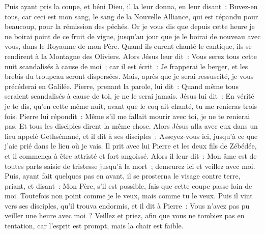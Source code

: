 \begin{multicols}{2}
Puis ayant pris la coupe, et béni Dieu, il la leur donna, en leur disant~: Buvez-en tous,
car ceci est mon sang, le sang de la Nouvelle Alliance, qui est répandu pour beaucoup, pour la rémission des péchés.
Or je vous dis que depuis cette heure je ne boirai point de ce fruit de vigne, jusqu'au jour que je le boirai de nouveau avec vous, dans le Royaume de mon Père.
Quand ils eurent chanté le cantique, ils se rendirent à la Montagne des Oliviers.
Alors Jésus leur dit~: Vous serez tous cette nuit scandalisés à cause de moi~; car il est écrit~: Je frapperai le berger, et les brebis du troupeau seront dispersées.
Mais, après que je serai ressuscité, je vous précéderai en Galilée.
Pierre, prenant la parole, lui dit~: Quand même tous seraient scandalisés à cause de toi, je ne le serai jamais.
Jésus lui dit~: En vérité je te dis, qu'en cette même nuit, avant que le coq ait chanté, tu me renieras trois fois.
Pierre lui répondit~: Même s'il me fallait mourir avec toi, je ne te renierai pas. Et tous les disciples dirent la même chose.
Alors Jésus alla avec eux dans un lieu appelé Gethsémané, et il dit à ses disciples~: Asseyez-vous ici, jusqu'à ce que j'aie prié dans le lieu où je vais.
Il prit avec lui Pierre et les deux fils de Zébédée, et il commença à être attristé et fort angoissé.
Alors il leur dit~: Mon âme est de toutes parts saisie de tristesse jusqu'à la mort~; demeurez ici et veillez avec moi.
Puis, ayant fait quelques pas en avant, il se prosterna le visage contre terre, priant, et disant~: Mon Père, s'il est possible, fais que cette coupe passe loin de moi. Toutefois non point comme je le veux, mais comme tu le veux.
Puis il vint vers ses disciples, qu'il trouva endormis, et il dit à Pierre~: Vous n'avez pas pu veiller une heure avec moi~?
Veillez et priez, afin que vous ne tombiez pas en tentation, car l'esprit est prompt, mais la chair est faible.

\end{multicols}
